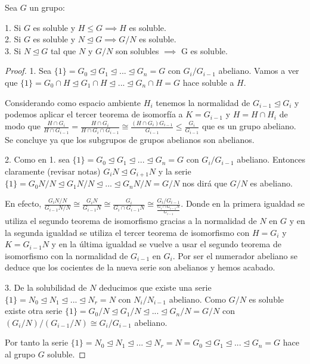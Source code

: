 \begin{nprop}
Sea $G$ un grupo:

1. Si $G$ es soluble y $H \le G \implies H$ es soluble.\\
2. Si $G$ es soluble y $N \trianglelefteq G \implies G/N$ es soluble.\\
3. Si $N \trianglelefteq G$ tal que $N$ y $G/N$ son solubles $\implies$ G es soluble.
\end{nprop}
\begin{proof}
1. Sea $\{1\} = G_0 \trianglelefteq G_1 \trianglelefteq ... \trianglelefteq G_n = G$ con $G_i/G_{i-1}$ abeliano. Vamos a ver que $\{1\} = G_0 \cap H \trianglelefteq G_1 \cap H \trianglelefteq ... \trianglelefteq G_n \cap H= G$ hace soluble a $H$.

Considerando como espacio ambiente $H_i$ tenemos la normalidad de $G_{i-1} \trianglelefteq G_i$ y podemos aplicar el tercer teorema de isomorfía a $K = G_{i-1}$ y $H = H \cap H_i$ de modo que $\frac{H \cap G_i}{H \cap G_{i-1}} = \frac{H \cap G_i}{H \cap G_{i} \cap G_{i-1}} \cong \frac{(H \cap G_i)G_{i-1}}{G_{i-1}} \le \frac{G_i}{G_{i-1}}$ que es un grupo abeliano. Se concluye ya que los subgrupos de grupos abelianos son abelianos.

2. Como en 1. sea $\{1\} = G_0 \trianglelefteq G_1 \trianglelefteq ... \trianglelefteq G_n = G$ con $G_i/G_{i-1}$ abeliano. Entonces claramente (revisar notas) $G_iN \trianglelefteq G_{i+1}N$ y la serie $\{1\} = G_0N/N \trianglelefteq G_1N/N \trianglelefteq ... \trianglelefteq G_nN/N = G/N$ nos dirá que $G/N$ es abeliano.

En efecto, $\frac{G_iN/N}{G_{i-1}N/N} \cong \frac{G_iN}{G_{i-1}N} \cong \frac{G_i}{G_i \cap G_{i-1}N} \cong \frac{G_i/G_{i-1}}{\frac{G_i \cap G_{i-1}N}{G_{i-1}}}$. Donde en la primera igualdad se utiliza el segundo teorema de isomorfismo gracias a la normalidad de $N$ en $G$ y en la segunda igualdad se utiliza el tercer teorema de isomorfismo con $H = G_{i}$ y $K = G_{i-1}N$ y en la última igualdad se vuelve a usar el segundo teorema de isomorfismo con la normalidad de $G_{i-1}$ en $G_i$. Por ser el numerador abeliano se deduce que los cocientes de la nueva serie son abelianos y hemos acabado.

3. De la solubilidad de $N$ deducimos que existe una serie $\{1\} = N_0 \trianglelefteq N_1 \trianglelefteq ... \trianglelefteq N_r = N$ con $N_i/N_{i-1}$ abeliano. Como $G/N$ es soluble existe otra serie $\{1\} = G_0/N \trianglelefteq G_1/N \trianglelefteq ... \trianglelefteq G_n/N = G/N$ con $(G_i/N)/(G_{i-1}/N) \cong G_i/G_{i-1}$ abeliano.

Por tanto la serie $\{1\} = N_0 \trianglelefteq N_1 \trianglelefteq ... \trianglelefteq N_r = N = G_0 \trianglelefteq G_1 \trianglelefteq ... \trianglelefteq G_n = G$ hace al grupo $G$ soluble.
\end{proof}

